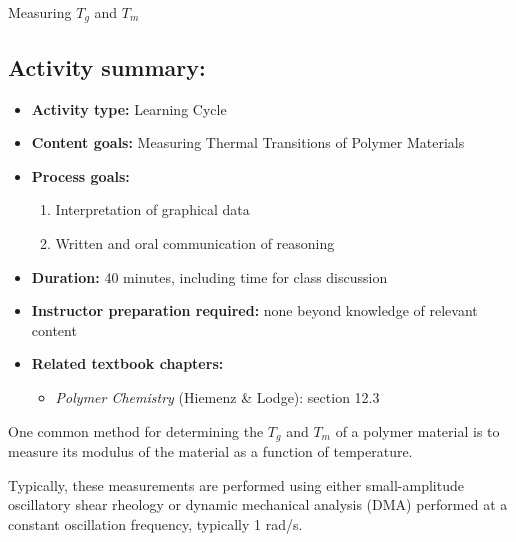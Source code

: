 \begin{activity}{Measuring $T_g$ and $T_m$}
\begin{instructornotes}
	\subsection*{Activity summary:}
	\begin{itemize}
		\item \textbf{Activity type:} Learning Cycle
		\item \textbf{Content goals:} Measuring Thermal Transitions of Polymer Materials
		\item \textbf{Process goals:} %
			\begin{enumerate}
				\item Interpretation of graphical data
				\item Written and oral communication of reasoning
			\end{enumerate}
		\item \textbf{Duration:} 40 minutes, including time for class discussion
		\item \textbf{Instructor preparation required:} none beyond knowledge of relevant content
		\item \textbf{Related textbook chapters:}
			\begin{itemize}
				\item \emph{Polymer Chemistry} (Hiemenz \& Lodge): section 12.3
			\end{itemize}
	\end{itemize}
	
\end{instructornotes}



\begin{model}
	\label{\labelbase:mdl:DMA}
	
	One common method for determining the $T_g$ and $T_m$ of a polymer material is to measure its modulus of the material as a function of temperature.
	
	Typically, these measurements are performed using either small-amplitude oscillatory shear rheology or dynamic mechanical analysis (DMA) performed at a constant oscillation frequency, typically 1 rad/s.
	
\end{model}



\end{activity}
